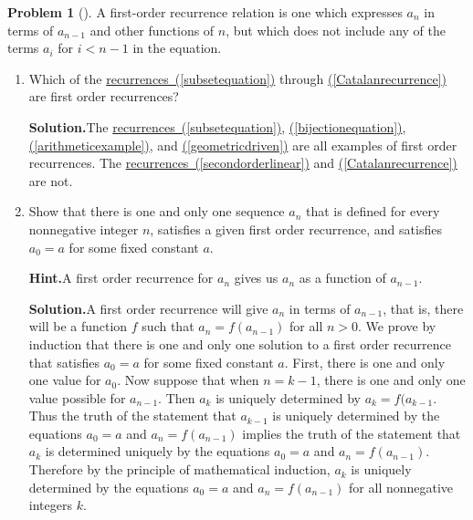 \documentclass[10pt,]{book}
\theoremstyle{plain}
\theoremstyle{definition}
\newtheorem{activity}[project]{Problem}
\theoremstyle{definition}
\numberwithin{equation}{chapter}
\newcommand{\lt}{<}
\begin{document}
\begin{activity}[]\label{activity-90}
A first-order recurrence relation is one which expresses \(a_n\) in terms of \(a_{n-1}\) and other functions of \(n\), but which does not include any of the terms \(a_i\) for \(i\lt n-1\) in the equation.%
\begin{enumerate}[font=\bfseries,label=(\alph*),ref=\alph*]
\item\label{task-83} Which of the \hyperref[subsetequation]{recurrences~(\ref{subsetequation})} through \hyperref[Catalanrecurrence]{(\ref{Catalanrecurrence})} are first order recurrences?%
\par\medskip\noindent%
\textbf{Solution.}\quad The \hyperref[subsetequation]{recurrences~(\ref{subsetequation})}, \hyperref[bijectionequation]{(\ref{bijectionequation})}, \hyperref[arithmeticexample]{(\ref{arithmeticexample})}, and \hyperref[geometricdriven]{(\ref{geometricdriven})} are all examples of first order recurrences. The \hyperref[secondorderlinear]{recurrences~(\ref{secondorderlinear})} and \hyperref[Catalanrecurrence]{(\ref{Catalanrecurrence})} are not.%
\item\label{task-84} Show that there is one and only one sequence \(a_n\) that is defined for every nonnegative integer \(n\), satisfies a given first order recurrence, and satisfies \(a_0=a\) for some fixed constant \(a\).%
\par\medskip\noindent%
\textbf{Hint.}\quad A first order recurrence for \(a_n\) gives us \(a_n\) as a function of \(a_{n-1}\).%
\par\medskip\noindent%
\textbf{Solution.}\quad A first order recurrence will give \(a_n\) in terms of \(a_{n-1}\), that is, there will be a function \(f\) such that \(a_n=f(a_{n-1})\) for all \(n>0\). We prove by induction that there is one and only one solution to a first order recurrence that satisfies \(a_0=a\) for some fixed constant \(a\). First, there is one and only one value for \(a_0\). Now suppose that when \(n=k-1\), there is one and only one value possible for \(a_{n-1}\). Then \(a_k\) is uniquely determined by \(a_k=f(a_{k-1}\). Thus the truth of the statement that \(a_{k-1}\) is uniquely determined by the equations \(a_0=a\) and \(a_n=f(a_{n-1})\) implies the truth of the statement that \(a_k\) is determined uniquely by the equations \(a_0=a\) and \(a_n=f(a_{n-1})\). Therefore by the principle of mathematical induction, \(a_k\) is uniquely determined by the equations \(a_0=a\) and \(a_n=f(a_{n-1})\) for all nonnegative integers \(k\).%
\end{enumerate}
\end{activity}
\end{document}
